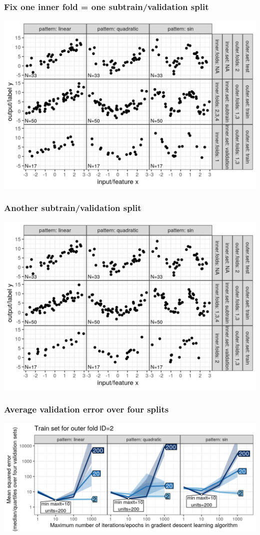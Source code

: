 \documentclass{beamer}
\begin{document}
\begin{frame}
  \frametitle{Fix one inner fold = one subtrain/validation split}

  \includegraphics[width=\textwidth]{figure-overfitting-cv-data-inner-folds-2-1.png}  
\end{frame}

\begin{frame}
  \frametitle{Another subtrain/validation split}

  \includegraphics[width=\textwidth]{figure-overfitting-cv-data-inner-folds-2-2.png}
\end{frame}

\begin{frame}
  \frametitle{Average validation error over four splits}

  \includegraphics[width=\textwidth]{figure-overfitting-cv-data-median-mse-2.png}
\end{frame}
\end{document}
